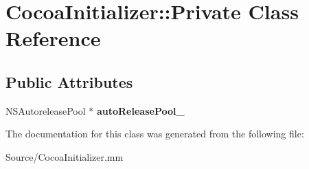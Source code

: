 \hypertarget{classCocoaInitializer_1_1Private}{}\section{Cocoa\+Initializer\+:\+:Private Class Reference}
\label{classCocoaInitializer_1_1Private}
\subsection*{Public Attributes}
\begin{DoxyCompactItemize}
\item 
N\+S\+Autorelease\+Pool $\ast$ {\bfseries auto\+Release\+Pool\+\_\+}\hypertarget{classCocoaInitializer_1_1Private_a8242bed2abdec29f1cf8745d6d9c0e7d}{}\label{classCocoaInitializer_1_1Private_a8242bed2abdec29f1cf8745d6d9c0e7d}

\end{DoxyCompactItemize}


The documentation for this class was generated from the following file\+:\begin{DoxyCompactItemize}
\item 
Source/Cocoa\+Initializer.\+mm\end{DoxyCompactItemize}
